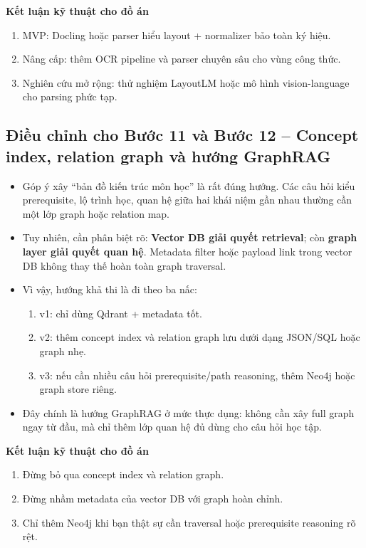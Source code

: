 \documentclass[12pt,a4paper]{article}
\begin{document}
\textbf{Kết luận kỹ thuật cho đồ án}
\begin{enumerate}[label=\arabic*.]
    \item MVP: Docling hoặc parser hiểu layout + normalizer bảo toàn ký hiệu.
    \item Nâng cấp: thêm OCR pipeline và parser chuyên sâu cho vùng công thức.
    \item Nghiên cứu mở rộng: thử nghiệm LayoutLM hoặc mô hình vision-language cho parsing phức tạp.
\end{enumerate}

\subsection{Điều chỉnh cho Bước 11 và Bước 12 -- Concept index, relation graph và hướng GraphRAG}

\begin{itemize}
    \item Góp ý xây ``bản đồ kiến trúc môn học'' là rất đúng hướng. Các câu hỏi kiểu prerequisite, lộ trình học, quan hệ giữa hai khái niệm gần nhau thường cần một lớp graph hoặc relation map.
    \item Tuy nhiên, cần phân biệt rõ: \textbf{Vector DB giải quyết retrieval}; còn \textbf{graph layer giải quyết quan hệ}. Metadata filter hoặc payload link trong vector DB không thay thế hoàn toàn graph traversal.
    \item Vì vậy, hướng khả thi là đi theo ba nấc:
    \begin{enumerate}[label=\alph*.]
        \item v1: chỉ dùng Qdrant + metadata tốt.
        \item v2: thêm concept index và relation graph lưu dưới dạng JSON/SQL hoặc graph nhẹ.
        \item v3: nếu cần nhiều câu hỏi prerequisite/path reasoning, thêm Neo4j hoặc graph store riêng.
    \end{enumerate}
    \item Đây chính là hướng GraphRAG ở mức thực dụng: không cần xây full graph ngay từ đầu, mà chỉ thêm lớp quan hệ đủ dùng cho câu hỏi học tập.
\end{itemize}

\textbf{Kết luận kỹ thuật cho đồ án}
\begin{enumerate}[label=\arabic*.]
    \item Đừng bỏ qua concept index và relation graph.
    \item Đừng nhầm metadata của vector DB với graph hoàn chỉnh.
    \item Chỉ thêm Neo4j khi bạn thật sự cần traversal hoặc prerequisite reasoning rõ rệt.
\end{enumerate}
\end{document}
